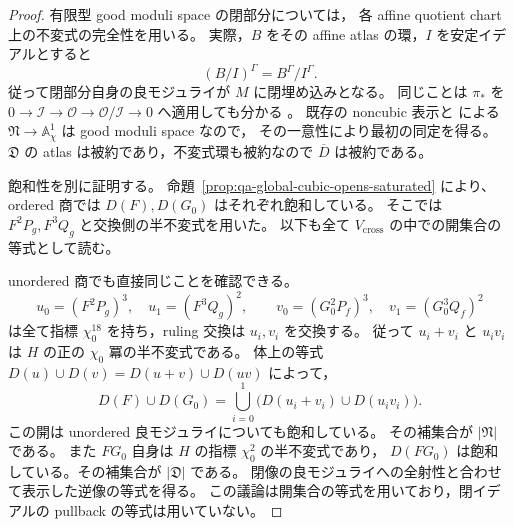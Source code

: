 \begin{proof}
有限型 good moduli space の閉部分については，
各 affine quotient chart 上の不変式の完全性を用いる。
実際，$B$ をその affine atlas の環，$I$ を安定イデアルとすると
\[
 (B/I)^\Gamma=B^\Gamma/I^\Gamma.
\]
従って閉部分自身の良モジュライが $M$ に閉埋め込みとなる。
同じことは $\pi_*$ を
$0\to\mathcal I\to\mathcal O\to\mathcal O/\mathcal I\to0$
へ適用しても分かる
\cite[Lemma 4.14, Theorem 4.16(iii)]{AlperGoodModuli2013}。
既存の noncubic 表示と
\cite[\texttt{cor:intrinsic-boundary-good-moduli}]{QuadricModuli2026}
による $\mathfrak N\to\mathbb A^1_\chi$ は good moduli space なので，
その一意性により最初の同定を得る。
$\mathfrak D$ の atlas は被約であり，不変式環も被約なので
$\overline D$ は被約である。

飽和性を別に証明する。
命題~\ref{prop:qa-global-cubic-opens-saturated} により、
ordered 商では $D(F),D(G_0)$ はそれぞれ飽和している。
そこでは $F^2P_g,F^3Q_g$ と交換側の半不変式を用いた。
以下も全て $V_{\mathrm{cross}}$ の中での開集合の等式として読む。

unordered 商でも直接同じことを確認できる。
\[
 u_0=(F^2P_g)^3,\quad u_1=(F^3Q_g)^2,
 \qquad
 v_0=(G_0^2P_f)^3,\quad v_1=(G_0^3Q_f)^2
\]
は全て指標 $\chi_0^{18}$ を持ち，ruling 交換は $u_i,v_i$ を交換する。
従って $u_i+v_i$ と $u_iv_i$ は $H$ の正の $\chi_0$ 冪の半不変式である。
体上の等式
$D(u)\cup D(v)=D(u+v)\cup D(uv)$ によって，
\[
 D(F)\cup D(G_0)=
 \bigcup_{i=0}^1\bigl(D(u_i+v_i)\cup D(u_iv_i)\bigr).
\]
この開は unordered 良モジュライについても飽和している。
その補集合が $|\mathfrak N|$ である。
また $FG_0$ 自身は $H$ の指標 $\chi_0^2$ の半不変式であり，
$D(FG_0)$ は飽和している。その補集合が $|\mathfrak D|$ である。
閉像の良モジュライへの全射性と合わせて表示した逆像の等式を得る。
この議論は開集合の等式を用いており，閉イデアルの pullback の等式は用いていない。
\end{proof}

